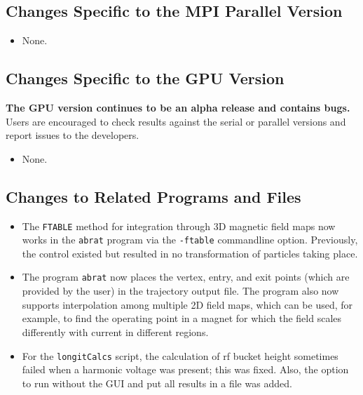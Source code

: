 \documentclass[11pt]{article}
\begin{document}
\subsection{Changes Specific to the MPI Parallel Version}

\begin{itemize}
\item None.
\end{itemize}

\subsection{Changes Specific to the GPU Version}

{\bf The GPU version continues to be an alpha release and contains bugs.}
Users are encouraged to check results against the serial or parallel versions and report issues to the developers.

\begin{itemize}
\item None.
\end{itemize}

\subsection{Changes to Related Programs and Files}

\begin{itemize}
\item The \verb|FTABLE| method for integration through 3D magnetic field maps now works in the \verb|abrat|
  program via the \verb|-ftable| commandline option. Previously, the control existed but resulted in no transformation
  of particles taking place.
\item The program \verb|abrat| now places the vertex, entry, and exit points (which are provided by the user)
  in the trajectory output file. The program also now supports interpolation among multiple 2D field maps, which
  can be used, for example, to find the operating point in a magnet for which the field scales differently with
  current in different regions.
\item For the \verb|longitCalcs| script, the calculation of rf bucket height sometimes failed when a harmonic voltage
  was present; this was fixed. Also, the option to run without the GUI and put all results in a file was added.
\end{itemize}
\end{document}
